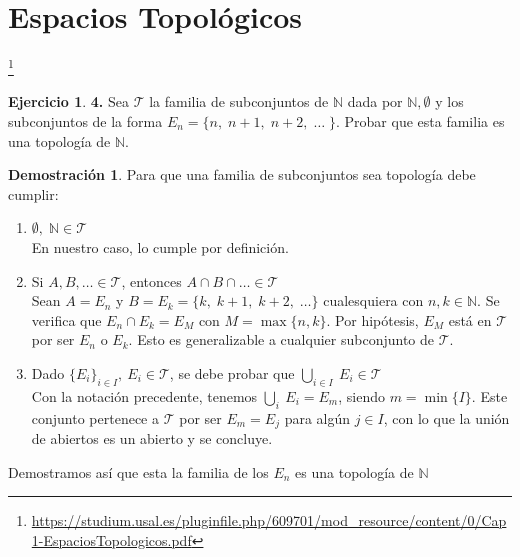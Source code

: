 \documentclass[12pt,twoside]{report}
\newcommand\mc[1]{\mathcal{#1}}
\theoremstyle{azul}
\theoremstyle{azul2}
\theoremstyle{plain}
\theoremstyle{definition}
\newtheorem*{dem}{Demostración}
\newtheorem*{ejern}{Ejercicio}
\theoremstyle{remark}
\begin{document}
\section{Espacios Topológicos} \vspace{-15mm} \hfill \footnote{\url{https://studium.usal.es/pluginfile.php/609701/mod_resource/content/0/Cap1-EspaciosTopologicos.pdf}}
\begin{ejern} \textbf{4.} Sea $\mc{T}$ la familia de subconjuntos de $\mathbb{N}$ dada por $\mathbb{N}, \emptyset$ y los subconjuntos de la forma $E_n=\{ n, \; n+1, \; n+2, \;  \ldots \; \}$. Probar que esta familia es una topología de $\mathbb{N}$. 
\begin{dem}
Para que una familia de subconjuntos sea topología debe cumplir: \vspace{-3mm}
\begin{enumerate}
    \item $\emptyset, \; \mathbb{N} \in \mc{T}$\\
    En nuestro caso, lo cumple por definición.
    \item Si $A,B,\ldots \in \mc{T}$, entonces $A \cap B \cap \ldots \in \mc{T}$ \\
    Sean $A=E_n$ y $B=E_k=\{k, \; k+1, \; k+2, \; \ldots \}$  cualesquiera con $n, k \in \mathbb{N}$. Se verifica que $E_n \cap E_k= E_M$ con $M = \max\{n,k\}$. Por hipótesis, $E_M$ está en $\mc{T}$ por ser $E_n$ o $E_k$. Esto es generalizable a cualquier subconjunto de $\mc{T}$.
    \item Dado $\{ E_i \}_{i \in I}, \: E_i \in \mc{T}$, se debe probar que $\underset{i\in I}\bigcup \: E_i \in \mc{T}$ \\
    Con la notación precedente, tenemos $\underset{i}\bigcup \: E_i = E_m$, siendo $m = \min\{I\}$. Este conjunto pertenece a $\mc{T}$ por ser $E_m = E_j$ para algún $j \in I$, con lo que la unión de abiertos es un abierto y se concluye.
\end{enumerate}
Demostramos así que esta la familia de los $E_n$ es una topología de $\mathbb{N}$
\end{dem}
\end{ejern}
\newpage
\end{document}
